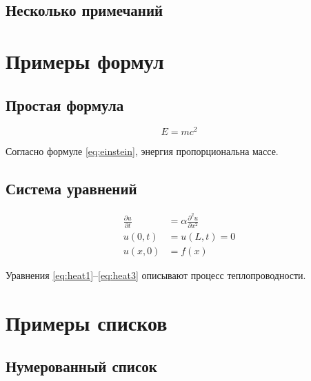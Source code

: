 
\subsection{Несколько примечаний}


\section{Примеры формул}

\subsection{Простая формула}

\begin{equation}
E = mc^2
\label{eq:einstein}
\end{equation}

Согласно формуле \ref{eq:einstein}, энергия пропорциональна массе.

\subsection{Система уравнений}

\begin{align}
\frac{\partial u}{\partial t} &= \alpha \frac{\partial^2 u}{\partial x^2} \label{eq:heat1} \\
u(0,t) &= u(L,t) = 0 \label{eq:heat2} \\
u(x,0) &= f(x) \label{eq:heat3}
\end{align}

Уравнения \ref{eq:heat1}--\ref{eq:heat3} описывают процесс теплопроводности.

\section{Примеры списков}

\subsection{Нумерованный список}

